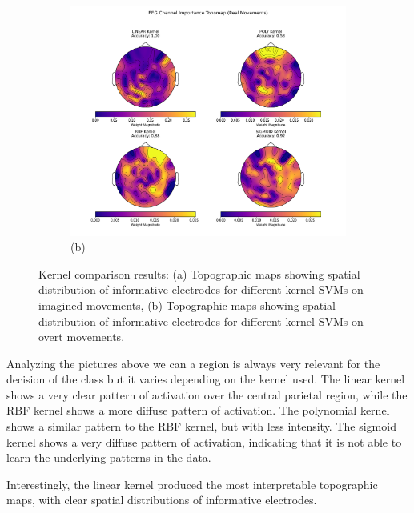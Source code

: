 \documentclass[
  letterpaper,
  DIV=11,
  numbers=noendperiod]{scrartcl}
\begin{document}
\begin{figure}
{\begin{figure}
\centering
\includegraphics[width=1\textwidth,height=\textheight]{figures/svm_topomaps_all_kernels_real.png}
\caption{(b)}\label{fig:topomap-imagined}
\end{figure}

}

\caption{\label{fig-kernel-comparison}Kernel comparison results: (a)
Topographic maps showing spatial distribution of informative electrodes
for different kernel SVMs on imagined movements, (b) Topographic maps
showing spatial distribution of informative electrodes for different
kernel SVMs on overt movements.}

\end{figure}%

Analyzing the pictures above we can a region is always very relevant for
the decision of the class but it varies depending on the kernel used.
The linear kernel shows a very clear pattern of activation over the
central parietal region, while the RBF kernel shows a more diffuse
pattern of activation. The polynomial kernel shows a similar pattern to
the RBF kernel, but with less intensity. The sigmoid kernel shows a very
diffuse pattern of activation, indicating that it is not able to learn
the underlying patterns in the data.

Interestingly, the linear kernel produced the most interpretable
topographic maps, with clear spatial distributions of informative
electrodes.
\end{document}
